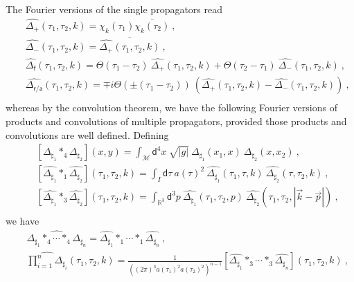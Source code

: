 \documentclass[12pt]{book}
\newcommand{\abs}[1]{\left|#1\right|}
\let\int\int
\newcommand{\Mcal}{\mathcal{M}}
\newcommand{\asf}{\mathsf{a}}
\newcommand{\dsf}{\mathsf{d}}
\newcommand{\fsf}{\mathsf{f}}
\newcommand{\rsf}{\mathsf{r}}
\theoremstyle{break}
\begin{document}
The Fourier versions of the single propagators read
%
\begin{eqnarray}
&& \widehat{\Delta_+}(\tau_1,\tau_2,k) = \chi_k(\tau_1) \overline{\chi_k(\tau_2)} \ , \nonumber \\
&& \widehat{\Delta_-}(\tau_1,\tau_2,k) = \overline{\widehat{\Delta_+}(\tau_1,\tau_2,k)} \ , \nonumber \\
&& \widehat{\Delta_\fsf}(\tau_1,\tau_2,k) = \Theta(\tau_1-\tau_2) \ \widehat{\Delta_+}(\tau_1,\tau_2,k) + \Theta(\tau_2-\tau_1) \ \widehat{\Delta_-}(\tau_1,\tau_2,k) \ , \nonumber \\
&& \widehat{\Delta_{\rsf/\asf}}(\tau_1,\tau_2,k) = \mp i \Theta\left(\pm(\tau_1-\tau_2)\right) \ \left(\widehat{\Delta_+}(\tau_1,\tau_2,k) - \widehat{\Delta_-}(\tau_1,\tau_2,k)\right) \ , \nonumber \\
\label{eq:propagators_fourier_exp}
\end{eqnarray}
%
whereas by the convolution theorem, we have the following Fourier versions of products and convolutions of multiple propagators, provided those products and convolutions are well defined. Defining
%
\begin{eqnarray}
&& \left[\Delta_{\sharp_1}\ast_4\Delta_{\sharp_2}\right](x,y) = \int_\Mcal \dsf^4x \ \sqrt{\abs{g}} \ \Delta_{\sharp_1}(x_1,x) \ \Delta_{\sharp_2}(x,x_2) \ , \nonumber \\
%
&& \left[\widehat{\Delta_{\sharp_1}}\ast_1\widehat{\Delta_{\sharp_2}}\right](\tau_1,\tau_2,k) = \int_I \dsf\tau \ a(\tau)^2 \ \widehat{\Delta_{\sharp_1}}(\tau_1,\tau,k) \ \widehat{\Delta_{\sharp_2}}(\tau,\tau_2,k) \ , \nonumber \\
%
&& \left[\widehat{\Delta_{\sharp_1}}\ast_3\widehat{\Delta_{\sharp_2}}\right](\tau_1,\tau_2,k) = \int_{\mathbb{R}^3} \dsf^3p \ \widehat{\Delta_{\sharp_1}}(\tau_1,\tau_2,p) \ \widehat{\Delta_{\sharp_2}}\left(\tau_1,\tau_2,|\vec{k}-\vec{p}|\right) \ , \nonumber \\
\label{eq:def_convolutions}
\end{eqnarray}
%
we have
%
\begin{eqnarray}
&& \widehat{\Delta_{\sharp_1}\ast_4\cdots\ast_4\Delta_{\sharp_n}}=\widehat{\Delta_{\sharp_1}}\ast_1\cdots\ast_1 \widehat{\Delta_{\sharp_n}} \ , \nonumber \\
&& \widehat{\prod^n_{i=1}\Delta_{\sharp_i}}(\tau_1,\tau_2,k)=\frac{1}{\left((2\pi)^3 a(\tau_1)^{2}a(\tau_2)^{2}\right)^{n-1}}\left[\widehat{\Delta_{\sharp_1}}\ast_3\cdots\ast_3\widehat{\Delta_{\sharp_n}}\right](\tau_1,\tau_2,k) \ , \nonumber \\
\label{eq:convolution_identities}
\end{eqnarray}
\end{document}
